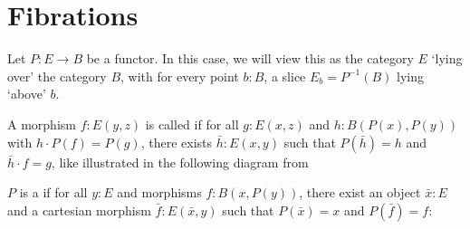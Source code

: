 \section{Fibrations}
Let $ P : E \to B $ be a functor. In this case, we will view this as the category $ E $ `lying over' the category $ B $, with for every point $ b: B $, a slice $ E_b = P^{-1}(B) $ lying `above' $ b $.

\begin{definition}
  A morphism $ f: E(y, z) $ is called  if for all $ g: E(x, z) $ and $ h: B(P(x), P(y)) $ with $ h \cdot P(f) = P(g) $, there exists $ \bar h: E(x, y) $ such that $ P(\bar h) = h $ and $ \bar h \cdot f = g $, like illustrated in the following diagram from \cite{nlab:grothendieck_fibration}
  \begin{center}
  \end{center}
\end{definition}

\begin{definition}
  $ P $ is a  if for all $ y: E $ and morphisms $ f: B(x, P(y)) $, there exist an object $ \bar x: E $ and a cartesian morphism $ \bar f: E(\bar x, y) $ such that $ P(\bar x) = x $ and $ P(\bar f) = f $:
  \begin{center}
  \end{center}
\end{definition}

